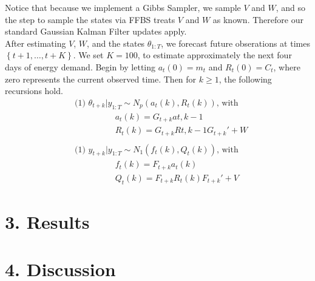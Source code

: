 \documentclass{article}
\begin{document}
Notice that because we implement a Gibbs Sampler, we sample $V$ and $W$, and so the step to sample the states via FFBS treats $V$ and $W$ as known. Therefore our standard Gaussian Kalman Filter updates apply.\\

After estimating $V$, $W$, and the states $\theta_{1:T}$, we forecast future obserations at times $\left\{t+1, \hdots, t+K \right\}$. We set $K=100$, to estimate approximately the next four days of energy demand.  Begin by letting $a_t(0) = m_t$ and $R_t(0) = C_t$, where zero represents the current observed time.  Then for $k \geq 1$, the following recursions hold.
\begin{align*}
		&\text{(1) } \theta_{t+k} | y_{1:T} \sim N_p\left(a_t(k), R_t(k) \right) \text{, with }\\
		&\hspace{2cm} a_t(k) = G_{t+k}a{t,k-1} \\
		&\hspace{2cm} R_t(k) = G_{t+k} R{t,k-1} G_{t+k}' + W \\\\
		&\text{(1) } y_{t+k} | y_{1:T} \sim N_1\left(f_t(k), Q_t(k) \right) \text{, with }\\
		&\hspace{2cm} f_t(k) = F_{t+k} a_t(k) \\
		&\hspace{2cm} Q_t(k) = F_{t+k} R_t(k) F_{t+k}' + V
\end{align*} 

\newpage
\section{3. Results}




\newpage
\section{4. Discussion}

\newpage
\end{document}
